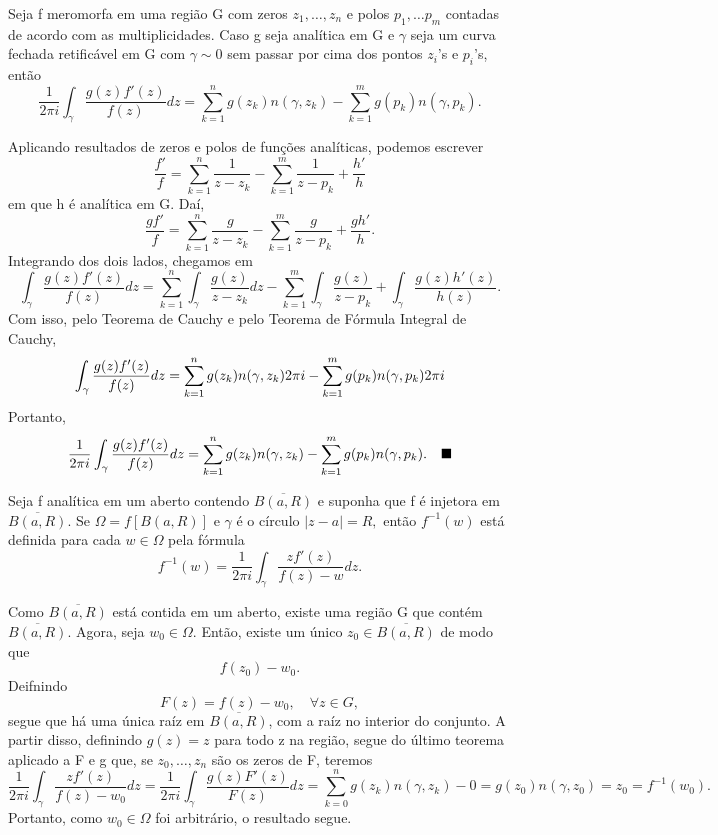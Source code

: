 \documentclass[complex.tex]{subfiles}
\begin{document}
\begin{theorem*}
	Seja f meromorfa em uma região G com zeros \(z_{1},\dotsc , z_{n}\) e polos \(p_{1},\dotsc p_{m}\)
	contadas de acordo com as multiplicidades. Caso g seja analítica em G e \(\gamma \) seja um curva fechada retificável em G
	com \(\gamma \sim 0\) sem passar por cima dos pontos \(z_{i}\)'s e \(p_{i}\)'s, então
	\[
		\frac{1}{2\pi i}\int_{\gamma }^{}\frac{g(z)f'(z)}{f(z)}dz = \sum\limits_{k=1}^{n}g(z_{k})n(\gamma , z_{k}) - \sum\limits_{k=1}^{m}g(p_{k})n(\gamma , p_{k}).
	\]
\end{theorem*}
\begin{proof*}
	Aplicando resultados de zeros e polos de funções analíticas, podemos escrever
	\[
		\frac{f'}{f} = \sum\limits_{k=1}^{n}\frac{1}{z-z_{k}} - \sum\limits_{k=1}^{m}\frac{1}{z-p_{k}} + \frac{h'}{h}
	\]
	em que h é analítica em G. Daí,
	\[
		\frac{gf'}{f} = \sum\limits_{k=1}^{n}\frac{g}{z-z_{k}} - \sum\limits_{k=1}^{m}\frac{g}{z-p_{k}} + \frac{gh'}{h}.
	\]
	Integrando dos dois lados, chegamos em
	\[
		\int_{\gamma }^{}\frac{g(z)f'(z)}{f(z)}dz = \sum\limits_{k=1}^{n}\int_{\gamma }^{}\frac{g(z)}{z-z_{k}}dz - \sum\limits_{k=1}^{m}\int_{\gamma }^{}\frac{g(z)}{z-p_{k}} + \int_{\gamma }^{}\frac{g(z)h'(z)}{h(z)}.
	\]
	Com isso, pelo Teorema de Cauchy e pelo Teorema de Fórmula Integral de Cauchy,
	\[
		\int_{\gamma }^{}\frac{g(z)f'(z)}{f(z)}dz = \sum\limits_{k=1}^{n}g(z_{k})n(\gamma , z_{k})2\pi i - \sum\limits_{k=1}^{m}g(p_{k})n(\gamma , p_{k})2\pi i\\
	\]
	Portanto,
	\[
		\frac{1}{2\pi i}\int_{\gamma }^{}\frac{g(z)f'(z)}{f(z)}dz = \sum\limits_{k=1}^{n}g(z_{k})n(\gamma , z_{k}) - \sum\limits_{k=1}^{m}g(p_{k})n(\gamma , p_{k}).\quad \text{$\blacksquare$}
	\]
\end{proof*}
\begin{prop*}
	Seja f analítica em um aberto contendo \(\overline{B(a, R)}\) e suponha que f é injetora em \(\overline{B(a, R)}.\) Se \(\Omega = f[B(a, R)]\) e \(\gamma \) é o círculo
	\(|z-a| = R,\) então \(f^{-1}(w)\) está definida para cada \(w\in \Omega \) pela fórmula
	\[
		f^{-1}(w) = \frac{1}{2\pi i}\int_{\gamma }^{}\frac{zf'(z)}{f(z)-w}dz.
	\]
\end{prop*}
\begin{proof*}
	Como \(\overline{B(a, R)}\) está contida em um aberto, existe uma região G que contém \(\overline{B(a, R)}.\) Agora, seja \(w_{0}\in\Omega .\) Então,
	existe um único \(z_{0}\in \overline{B(a, R)}\) de modo que
	\[
		f(z_{0}) - w_{0}.
	\]
	Deifnindo
	\[
		F(z) = f(z)-w_{0},\quad \forall z\in G,
	\]
	segue que há uma única raíz em \(\overline{B(a, R)}\), com a raíz no interior do conjunto. A partir disso, definindo \(g(z) = z\) para todo z na região, segue do último teorema
	aplicado a F e g que, se \(z_{0},\dotsc , z_{n}\) são os zeros de F, teremos
	\[
		\frac{1}{2\pi i}\int_{\gamma }^{}\frac{zf'(z)}{f(z) - w_{0}}dz = \frac{1}{2\pi i}\int_{\gamma }^{}\frac{g(z)F'(z)}{F(z)}dz = \sum\limits_{k=0}^{n}g(z_{k})n(\gamma , z_{k}) - 0 = g(z_{0})n(\gamma , z_{0}) = z_{0} = f^{-1}(w_{0}).
	\]
	Portanto, como \(w_{0}\in \Omega \) foi arbitrário, o resultado segue. \qedsymbol
\end{proof*}
\end{document}
